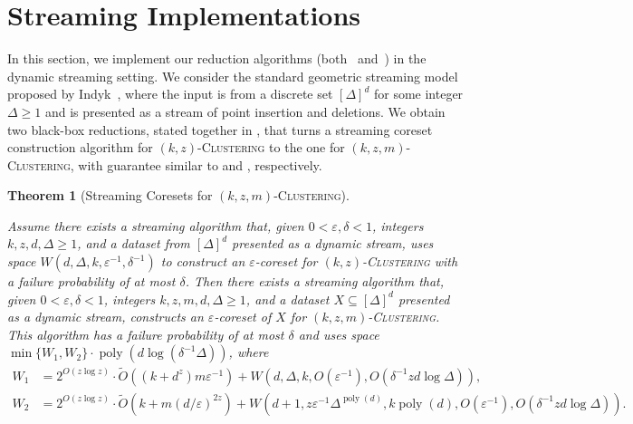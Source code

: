 \documentclass[letterpaper,11pt]{article}
\theoremstyle{plain}
\newtheorem{theorem}{Theorem}[section]
\theoremstyle{definition}
\theoremstyle{remark}
\DeclareMathOperator{\poly}{poly}
\newcommand{\eps}{\varepsilon}
\newcommand{\ProblemName}[1]{\textsc{#1}}
\newcommand{\kzC}{\ProblemName{$(k,z)$-Clustering}\xspace}
\newcommand{\kzmC}{\ProblemName{$(k,z,m)$-Clustering}\xspace}
\begin{document}
\section{Streaming Implementations}
\label{sec:streaming}

In this section, we implement our reduction algorithms (both~ and~) in the dynamic streaming setting. 
We consider the standard geometric streaming model proposed by Indyk~\cite{DBLP:conf/stoc/Indyk04},
where the input is from a discrete set $[\Delta]^d$ for some integer $\Delta \geq 1$ and is presented as a stream of point insertion and deletions.
We obtain two black-box reductions, stated together in , that turns a streaming coreset construction algorithm for \kzC to the one for \kzmC, with guarantee similar to  and , respectively. 


\begin{theorem}[Streaming Coresets for \kzmC]
    \label{thm:dynamic coresets}

    Assume there exists a streaming algorithm that, given $0< \eps,\delta < 1$, integers $k, z, d, \Delta \geq 1$, and a dataset from $[\Delta]^d$ presented as a dynamic stream, uses space $W(d,\Delta, k, \eps^{-1},\delta^{-1})$ to construct an $\eps$-coreset for \kzC with a failure probability of at most $\delta$.
Then there exists a streaming algorithm that, given $0< \eps,\delta < 1$, integers $k,z,m,d,\Delta\ge 1$, and a dataset $X\subseteq [\Delta]^d$ presented as a dynamic stream, constructs an $\eps$-coreset of $X$ for \kzmC. This algorithm has a failure probability of at most $\delta$ and uses space $\min\{W_1,W_2\}\cdot \poly(d\log(\delta^{-1}\Delta))$, where 
    \begin{equation*}   
        \begin{aligned}
        W_1 &= 2^{O(z\log z)}\cdot \tilde O\left((k+d^z)m\eps^{-1}\right)+ W\left(d,\Delta,k,O(\eps^{-1}),O(\delta^{-1}zd\log\Delta)\right),\\
        W_2 &= 2^{O(z\log z)}\cdot \tilde O\left(k + m(d/\eps)^{2z}\right) + W\left(d+1, z\eps^{-1}\Delta^{\poly(d)}, k\poly(d), O(\eps^{-1}),O(\delta^{-1}zd\log\Delta)\right).
        \end{aligned}
    \end{equation*}
\end{theorem}
\end{document}

